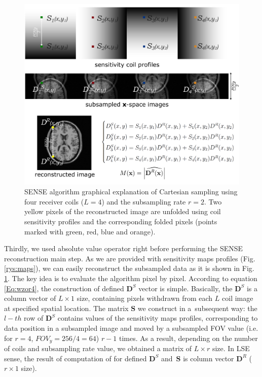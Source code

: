 \begin{figure}[h!]
\centering
  \includegraphics[scale=0.36]{figures/Module_01/SENSE.pdf}
  \caption{SENSE algorithm graphical explanation of Cartesian sampling using four receiver
coils ($L = 4$) and the subsampling rate $r = 2$. Two yellow pixels of the reconstructed image are
unfolded using coil sensitivity profiles and the corresponding folded pixels (points marked with
green, red, blue and orange).}
  \label{rys:sense}
\end{figure}

Thirdly, we used absolute value operator right before performing the SENSE reconstruction main step. As we are provided with sensitivity maps profiles (Fig. \ref{rys:maps}), we can easily reconstruct the subsampled data as it is shown in Fig. \ref{rys:sense}.
The key idea is to evaluate the algorithm pixel by pixel. According to equation \ref{Eq:wzor4}, the construction of defined $\textbf{D}^{S}$ vector is simple. Basically, the $\textbf{D}^{S}$ is a column vector of $L\times1$ size, containing pixels withdrawn from each $L$ coil image at specified spatial location. The matrix $\textbf{S}$ we construct in a~subsequent way: the $l-th$ row of $\textbf{D}^{S}$ contains values of the sensitivity maps profiles, corresponding to data position in a subsampled image and moved by a subsampled FOV value (i.e. for $r=4$, $FOV_{y} = 256/4 = 64$) $r-1$ times. As a result, depending on the number of coils and subsampling rate value, we obtained a matrix of $L\times r$ size. In LSE sense, the result of computation of  for defined $\textbf{D}^{S}$ and~$\textbf{S}$ is column vector $\textbf{D}^{R}$ ($r\times 1$ size). 

